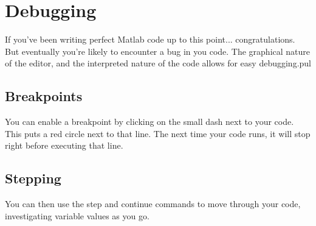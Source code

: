 
\section{Debugging}
If you've been writing perfect Matlab code up to this point... congratulations.
 But eventually you're likely to encounter a bug in you code.
 The graphical nature of the editor, and the interpreted nature of the code allows for easy debugging.pul

\subsection{Breakpoints}
You can enable a breakpoint by clicking on the small dash next to your code.
 This puts a red circle next to that line.
 The next time your code runs, it will stop right before executing that line.

\begin{quote}

\end{quote}

\pagebreak
\subsection{Stepping}
You can then use the step and continue commands to move through your code, investigating variable values as you go.

\begin{quote}
 
\end{quote}
